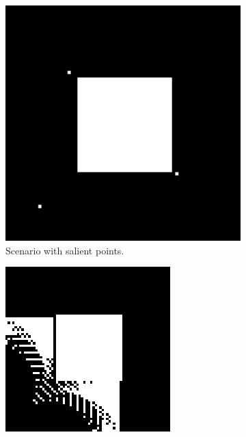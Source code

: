 \begin{figure}[H]
    \centering
    \begin{subfigure}{0.3\textwidth}
        \centering
        \includegraphics[width=\textwidth]{Images/Algorithm_obs/graph/Graph_explainiation_images/scene_before_graph.png}
        \caption{Scenario with salient points.}
    \end{subfigure} 
    \hfill
    \begin{subfigure}{0.3\textwidth}
        \centering
        \includegraphics[width=\textwidth]{Images/Algorithm_obs/graph/Graph_explainiation_images/scene_after_graph_generation.png}

\end{subfigure}
\end{figure}
